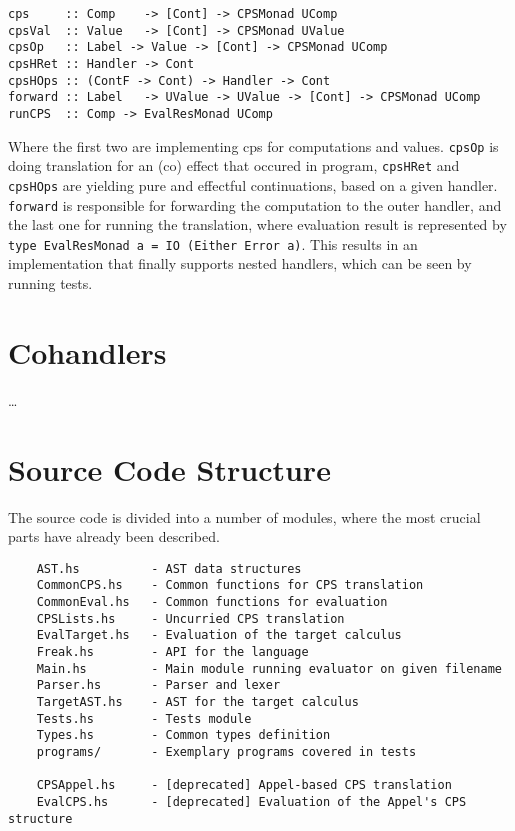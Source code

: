 \documentclass[declaration,shortabstract]{iithesis}
\theoremstyle{definition} \newtheorem{definition}{Definition}[chapter]
\theoremstyle{remark} \newtheorem{remark}[definition]{Observation}
\theoremstyle{plain} \newtheorem{theorem}[definition]{Theorem}
\theoremstyle{plain} \newtheorem{lemma}[definition]{Lemma}
\begin{document}
\begin{verbatim}
cps     :: Comp    -> [Cont] -> CPSMonad UComp
cpsVal  :: Value   -> [Cont] -> CPSMonad UValue
cpsOp   :: Label -> Value -> [Cont] -> CPSMonad UComp
cpsHRet :: Handler -> Cont
cpsHOps :: (ContF -> Cont) -> Handler -> Cont
forward :: Label   -> UValue -> UValue -> [Cont] -> CPSMonad UComp
runCPS  :: Comp -> EvalResMonad UComp
\end{verbatim}

    \noindent
    Where the first two are implementing cps for computations and values.
    \verb!cpsOp! is doing translation for an (co) effect that occured in program,
    \verb!cpsHRet! and \verb!cpsHOps! are yielding pure and effectful continuations,
    based on a given handler. \verb!forward! is responsible for forwarding the
    computation to the outer handler, and the last one for running the
    translation, where evaluation result is represented by\\
    \verb!type EvalResMonad a = IO (Either Error a)!. This results in an
    implementation that finally supports nested handlers, which can be seen by
    running tests.

    \section{Cohandlers}
    \ldots

    \section{Source Code Structure}

    The source code is divided into a number of modules, where the most
    crucial parts have already been described.

\begin{verbatim}
    AST.hs          - AST data structures
    CommonCPS.hs    - Common functions for CPS translation
    CommonEval.hs   - Common functions for evaluation
    CPSLists.hs     - Uncurried CPS translation
    EvalTarget.hs   - Evaluation of the target calculus
    Freak.hs        - API for the language
    Main.hs         - Main module running evaluator on given filename
    Parser.hs       - Parser and lexer
    TargetAST.hs    - AST for the target calculus
    Tests.hs        - Tests module
    Types.hs        - Common types definition
    programs/       - Exemplary programs covered in tests

    CPSAppel.hs     - [deprecated] Appel-based CPS translation
    EvalCPS.hs      - [deprecated] Evaluation of the Appel's CPS structure
\end{verbatim}
\end{document}
